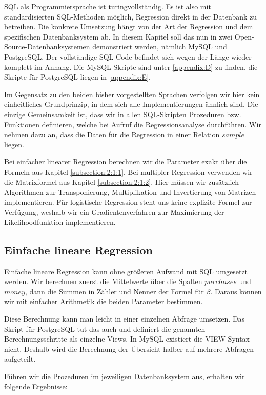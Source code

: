 SQL als Programmiersprache ist turingvollständig. Es ist also mit standardisierten SQL-Methoden möglich, Regression direkt in der Datenbank zu betreiben. Die konkrete Umsetzung hängt von der Art der Regression und dem spezifischen Datenbanksystem ab. In diesem Kapitel soll das nun in zwei Open-Source-Datenbanksystemen demonstriert werden, nämlich MySQL und PostgreSQL. Der vollständige SQL-Code befindet sich wegen der Länge wieder komplett im Anhang. Die MySQL-Skripte sind unter \ref{appendix:D} zu finden, die Skripte für PostgreSQL liegen in \ref{appendix:E}.

Im Gegensatz zu den beiden bisher vorgestellten Sprachen verfolgen wir hier kein einheitliches Grundprinzip, in dem sich alle Implementierungen ähnlich sind. Die einzige Gemeinsamkeit ist, dass wir in allen SQL-Skripten Prozeduren bzw. Funktionen definieren, welche bei Aufruf die Regressionsanalyse durchführen. Wir nehmen dazu an, dass die Daten für die Regression in einer Relation $sample$ liegen.

Bei einfacher linearer Regression berechnen wir die Parameter exakt über die Formeln aus Kapitel \ref{subsection:2:1:1}. Bei multipler Regression verwenden wir die Matrixformel aus Kapitel \ref{subsection:2:1:2}. Hier müssen wir zusätzlich Algorithmen zur Transponierung, Multiplikation und Invertierung von Matrizen implementieren. Für logistische Regression steht uns keine explizite Formel zur Verfügung, weshalb wir ein Gradientenverfahren zur Maximierung der Likelihoodfunktion implementieren.

\subsection{Einfache lineare Regression}
\label{subsection:3:4:1}

Einfache lineare Regression kann ohne größeren Aufwand mit SQL umgesetzt werden. Wir berechnen zuerst die Mittelwerte über die Spalten $purchases$ und $money$, dann die Summen in Zähler und Nenner der Formel für $\beta$. Daraus können wir mit einfacher Arithmetik die beiden Parameter bestimmen.

Diese Berechnung kann man leicht in einer einzelnen Abfrage umsetzen. Das Skript für PostgreSQL tut das auch und definiert die genannten Berechnungsschritte als einzelne Views. In MySQL existiert die VIEW-Syntax nicht. Deshalb wird die Berechnung der Übersicht halber auf mehrere Abfragen aufgeteilt.

Führen wir die Prozeduren im jeweiligen Datenbanksystem aus, erhalten wir folgende Ergebnisse:

